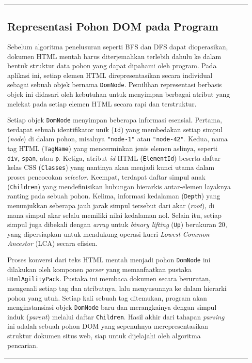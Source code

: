 \documentclass[12pt]{article}
\begin{document}
\begin{table}[H]
\begin{tabular}{|l|c|c|}
\begin{document}
\subsection{Representasi Pohon DOM pada Program}

Sebelum algoritma penelusuran seperti BFS dan DFS dapat dioperasikan, dokumen HTML mentah harus diterjemahkan terlebih dahulu ke dalam bentuk struktur data pohon yang dapat dipahami oleh program. Pada aplikasi ini, setiap elemen HTML direpresentasikan secara individual sebagai sebuah objek bernama \texttt{DomNode}. Pemilihan representasi berbasis objek ini didasari oleh kebutuhan untuk menyimpan berbagai atribut yang melekat pada setiap elemen HTML secara rapi dan terstruktur.

Setiap objek \texttt{DomNode} menyimpan beberapa informasi esensial. Pertama, terdapat sebuah identifikator unik (\texttt{Id}) yang membedakan setiap simpul (\textit{node}) di dalam pohon, misalnya \texttt{"node-1"} atau \texttt{"node-42"}. Kedua, nama tag HTML (\texttt{TagName}) yang mencerminkan jenis elemen aslinya, seperti \verb|div|, \verb|span|, atau \verb|p|. Ketiga, atribut \textit{id} HTML (\texttt{ElementId}) beserta daftar kelas CSS (\texttt{Classes}) yang nantinya akan menjadi kunci utama dalam proses pencocokan \textit{selector}. Keempat, terdapat daftar simpul anak (\texttt{Children}) yang mendefinisikan hubungan hierarkis antar-elemen layaknya ranting pada sebuah pohon. Kelima, informasi kedalaman (\texttt{Depth}) yang menunjukkan seberapa jauh jarak simpul tersebut dari akar (\textit{root}), di mana simpul akar selalu memiliki nilai kedalaman nol. Selain itu, setiap simpul juga dibekali dengan \textit{array} untuk \textit{binary lifting} (\texttt{Up}) berukuran 20, yang dipersiapkan untuk mendukung operasi kueri \textit{Lowest Common Ancestor} (LCA) secara efisien.

Proses konversi dari teks HTML mentah menjadi pohon \texttt{DomNode} ini dilakukan oleh komponen \textit{parser} yang memanfaatkan pustaka \texttt{HtmlAgilityPack}. Pustaka ini membaca dokumen secara berurutan, mengenali setiap tag dan atributnya, lalu menyusunnya ke dalam hierarki pohon yang utuh. Setiap kali sebuah tag ditemukan, program akan menginstansiasi objek \texttt{DomNode} baru dan merangkainya dengan simpul induk (\textit{parent}) melalui daftar \texttt{Children}. Hasil akhir dari tahapan \textit{parsing} ini adalah sebuah pohon DOM yang sepenuhnya merepresentasikan struktur dokumen situs web, siap untuk dijelajahi oleh algoritma pencarian.


\end{document}
\end{tabular}
\end{table}
\end{document}
